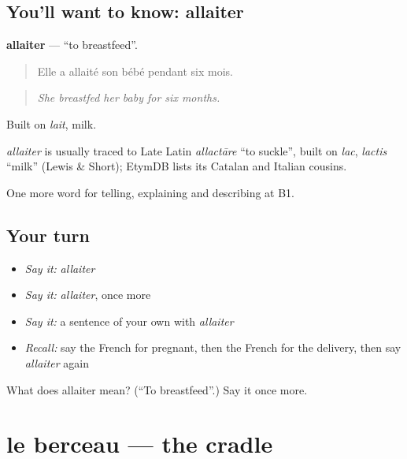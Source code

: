 \subsection*{You'll want to know: allaiter}
\textbf{allaiter} — \textquotedblleft{}to breastfeed\textquotedblright{}.

\begin{quote}
Elle a allaité son bébé pendant six mois.
\end{quote}

\begin{quote}
\emph{She breastfed her baby for six months.}
\end{quote}

Built on \emph{lait}, milk.

\begin{cousinweb}
\emph{allaiter} is usually traced to Late Latin \emph{allactāre} \textquotedblleft{}to suckle\textquotedblright{}, built on \emph{lac}, \emph{lactis} \textquotedblleft{}milk\textquotedblright{} (Lewis \& Short); EtymDB lists its Catalan and Italian cousins.
\end{cousinweb}

\begin{grammarlens}[title={What you've built}]
One more word for telling, explaining and describing at B1.
\end{grammarlens}

\subsection*{Your turn}
\begin{itemize}
\raggedright
  \item \emph{Say it:} \emph{allaiter}
  \item \emph{Say it:} \emph{allaiter}, once more
  \item \emph{Say it:} a sentence of your own with \emph{allaiter}
  \item \emph{Recall:} say the French for pregnant, then the French for the delivery, then say \emph{allaiter} again
\end{itemize}

\begin{tcolorbox}[breakable,colback=teal!4,colframe=teal!35!black,title={Before you move on}]
What does allaiter mean? (\textquotedblleft{}To breastfeed\textquotedblright{}.) Say it once more.
\end{tcolorbox}
\section[le berceau]{le berceau — the cradle}


